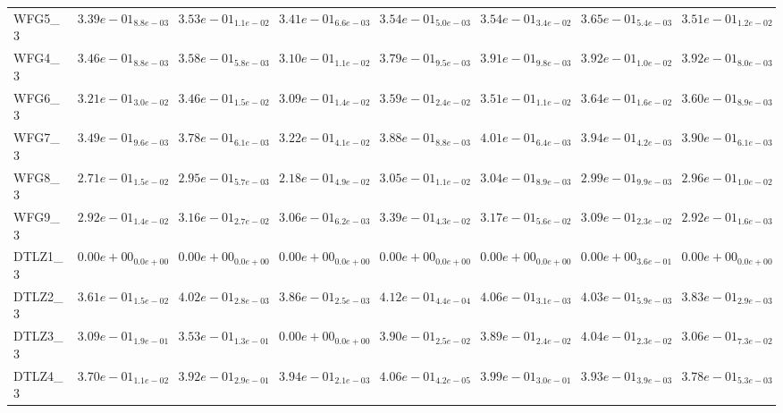 \documentclass{article}
\begin{document}
\begin{landscape}
\begin{table}
\begin{scriptsize}
\begin{tabular}{llllllll}
WFG5\_3 & $  3.39e-01_{ 8.8e-03}$ & $  3.53e-01_{ 1.1e-02}$ & $  3.41e-01_{ 6.6e-03}$ & $  3.54e-01_{ 5.0e-03}$ & \cellcolor{gray25}$  3.54e-01_{ 3.4e-02}$ & \cellcolor{gray95}$  3.65e-01_{ 5.4e-03}$ & $  3.51e-01_{ 1.2e-02}$ \\
WFG4\_3 & $  3.46e-01_{ 8.8e-03}$ & $  3.58e-01_{ 5.8e-03}$ & $  3.10e-01_{ 1.1e-02}$ & $  3.79e-01_{ 9.5e-03}$ & $  3.91e-01_{ 9.8e-03}$ & \cellcolor{gray95}$  3.92e-01_{ 1.0e-02}$ & \cellcolor{gray25}$  3.92e-01_{ 8.0e-03}$ \\
WFG6\_3 & $  3.21e-01_{ 3.0e-02}$ & $  3.46e-01_{ 1.5e-02}$ & $  3.09e-01_{ 1.4e-02}$ & $  3.59e-01_{ 2.4e-02}$ & $  3.51e-01_{ 1.1e-02}$ & \cellcolor{gray95}$  3.64e-01_{ 1.6e-02}$ & \cellcolor{gray25}$  3.60e-01_{ 8.9e-03}$ \\
WFG7\_3 & $  3.49e-01_{ 9.6e-03}$ & $  3.78e-01_{ 6.1e-03}$ & $  3.22e-01_{ 4.1e-02}$ & $  3.88e-01_{ 8.8e-03}$ & \cellcolor{gray95}$  4.01e-01_{ 6.4e-03}$ & \cellcolor{gray25}$  3.94e-01_{ 4.2e-03}$ & $  3.90e-01_{ 6.1e-03}$ \\
WFG8\_3 & $  2.71e-01_{ 1.5e-02}$ & $  2.95e-01_{ 5.7e-03}$ & $  2.18e-01_{ 4.9e-02}$ & \cellcolor{gray95}$  3.05e-01_{ 1.1e-02}$ & \cellcolor{gray25}$  3.04e-01_{ 8.9e-03}$ & $  2.99e-01_{ 9.9e-03}$ & $  2.96e-01_{ 1.0e-02}$ \\
WFG9\_3 & $  2.92e-01_{ 1.4e-02}$ & $  3.16e-01_{ 2.7e-02}$ & $  3.06e-01_{ 6.2e-03}$ & \cellcolor{gray95}$  3.39e-01_{ 4.3e-02}$ & \cellcolor{gray25}$  3.17e-01_{ 5.6e-02}$ & $  3.09e-01_{ 2.3e-02}$ & $  2.92e-01_{ 1.6e-03}$ \\
DTLZ1\_3 & $  0.00e+00_{ 0.0e+00}$ & $  0.00e+00_{ 0.0e+00}$ & $  0.00e+00_{ 0.0e+00}$ & $  0.00e+00_{ 0.0e+00}$ & $  0.00e+00_{ 0.0e+00}$ & $  0.00e+00_{ 3.6e-01}$ & $  0.00e+00_{ 0.0e+00}$ \\
DTLZ2\_3 & $  3.61e-01_{ 1.5e-02}$ & $  4.02e-01_{ 2.8e-03}$ & $  3.86e-01_{ 2.5e-03}$ & \cellcolor{gray95}$  4.12e-01_{ 4.4e-04}$ & \cellcolor{gray25}$  4.06e-01_{ 3.1e-03}$ & $  4.03e-01_{ 5.9e-03}$ & $  3.83e-01_{ 2.9e-03}$ \\
DTLZ3\_3 & $  3.09e-01_{ 1.9e-01}$ & $  3.53e-01_{ 1.3e-01}$ & $  0.00e+00_{ 0.0e+00}$ & \cellcolor{gray25}$  3.90e-01_{ 2.5e-02}$ & $  3.89e-01_{ 2.4e-02}$ & \cellcolor{gray95}$  4.04e-01_{ 2.3e-02}$ & $  3.06e-01_{ 7.3e-02}$ \\
DTLZ4\_3 & $  3.70e-01_{ 1.1e-02}$ & $  3.92e-01_{ 2.9e-01}$ & $  3.94e-01_{ 2.1e-03}$ & \cellcolor{gray95}$  4.06e-01_{ 4.2e-05}$ & \cellcolor{gray25}$  3.99e-01_{ 3.0e-01}$ & $  3.93e-01_{ 3.9e-03}$ & $  3.78e-01_{ 5.3e-03}$ \\

\end{tabular}
\end{scriptsize}
\end{table}
\end{landscape}
\end{document}
